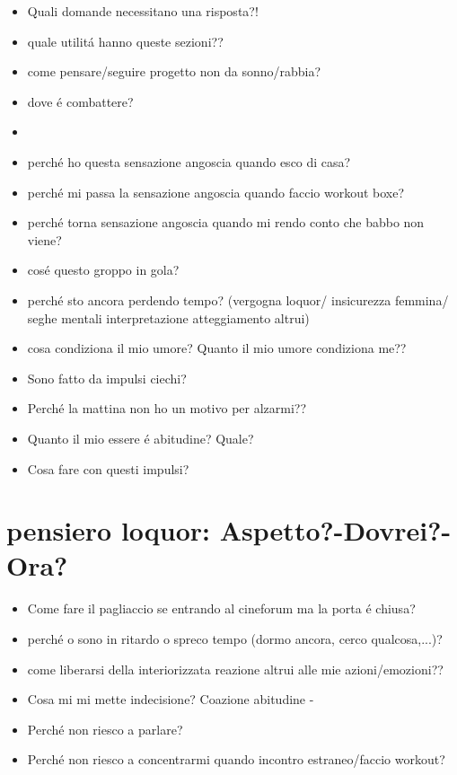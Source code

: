 \begin{itemize}
\item Quali domande necessitano una risposta?!
\item quale utilit\'a hanno queste sezioni??
\item come pensare/seguire progetto non da sonno/rabbia?
\item dove \'e combattere?
\item {}
\item perch\'e ho questa sensazione angoscia quando esco di casa?
\item perch\'e mi passa la sensazione angoscia quando faccio workout boxe?
\item perch\'e torna sensazione angoscia quando mi rendo conto che babbo non viene?
\item cos\'e questo groppo in gola?
\item perch\'e sto ancora perdendo tempo?
(vergogna loquor/ insicurezza femmina/ seghe mentali interpretazione atteggiamento altrui)
\item cosa condiziona il mio umore? Quanto il mio umore condiziona me??
\item Sono fatto da impulsi ciechi?
\item Perch\'e la mattina non ho un motivo per alzarmi??
\item Quanto il mio essere \'e abitudine? Quale?
\item Cosa fare con questi impulsi?
\end{itemize}

\section{pensiero loquor: Aspetto?-Dovrei?-Ora?}

\begin{itemize}
\item Come fare il pagliaccio se entrando al cineforum ma la porta \'e chiusa?
\item perch\'e o sono in ritardo o spreco tempo (dormo ancora, cerco qualcosa,...)?
\item come liberarsi della interiorizzata reazione altrui alle mie azioni/emozioni??
\item Cosa mi mi mette indecisione? Coazione abitudine  - 
\item Perch\'e non riesco a parlare?
\item Perch\'e non riesco a concentrarmi quando incontro estraneo/faccio workout?
\end{itemize}

